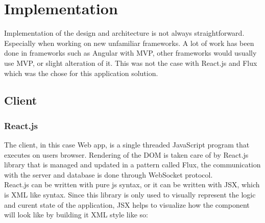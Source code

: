 \chapter{Implementation}
Implementation of the design and architecture is not always straightforward. Especially when working on new unfamiliar frameworks. A lot of work has been done in frameworks such as Angular with MVP, other frameworks would usually use MVP, or slight alteration of it. This was not the case with React.js and Flux which was the chose for this application solution.

\section{Client}

\subsection{React.js}
The client, in this case Web app, is a single threaded JavaScript program that executes on users browser. Rendering of the DOM is taken care of by React.js library that is managed and updated in a pattern called Flux, the communication with the server and database is done through WebSocket protocol.
\\React.js can be written with pure js syntax, or it can be written with JSX, which is XML like syntax. Since this library is only used to visually represent the logic and curent state of the application, JSX helps to visualize how the component will look like by building it XML style like so:

\newpage



